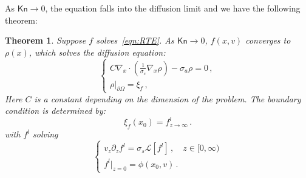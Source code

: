 \documentclass[english,reqno]{amsart}
\theoremstyle{plain}
\newtheorem{theorem}{Theorem}
\theoremstyle{definition} %
\newcommand{\Kn}{\mathsf{Kn}}
\begin{document}
As $\Kn\to 0$, the equation falls into the diffusion limit and we have the following theorem:
\begin{theorem}\label{thm:diffusion}
Suppose $f$ solves~\eqref{eqn:RTE}. As $\Kn\to 0$, $f(x,v)$ converges to $\rho(x)$, which solves the diffusion equation:
\begin{equation}\label{eqn:diff}
\begin{cases}
C\nabla_x\cdot \left(\frac{1}{\sigma_s}\nabla_x\rho \right) - \sigma_a\rho= 0\,,\\
\rho|_{\partial\Omega} = \xi_f\,,
\end{cases}
\end{equation} 
Here $C$ is a constant depending on the dimension of the problem. The boundary condition is determined by:
\begin{equation*}
\xi_f(x_0) = f^l_{z\to\infty}\,.
\end{equation*}
with $f^l$ solving
\begin{equation*}
\begin{cases}
v_z\partial_zf^l = \sigma_s\mathcal{L}[f^l]\,,  \quad z\in [0, \infty) \\
f^l|_{z=0} = \phi(x_0,v)\,.
\end{cases}
\end{equation*}
\end{theorem}
\end{document}
